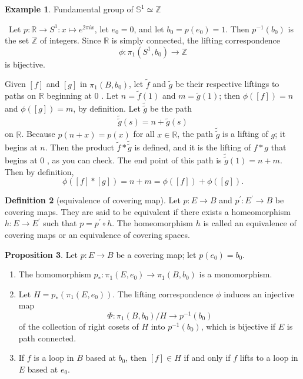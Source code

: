\documentclass[12pt,a4paper]{book}
\newenvironment{prooff}{{\noindent\it\textcolor{cyan!40!black}{Proof}:}\,}{\par}
\newcommand{\bb}[1]{\mathbb{#1}}
\newenvironment{enu}{\begin{enumerate}[(1)]}{\end{enumerate}}
\theoremstyle{definition}
\newtheorem{defn}{Definition}[section]
\newtheorem{prop}[defn]{Proposition}
\newtheorem{exam}[defn]{Example}
\begin{document}
\begin{exam}
    Fundamental group of $\bb{S}^1\simeq \bb{Z}$
    \label{example:fundamental group of S1}
\end{exam}
\begin{prooff}
    Let $p: \mathbb{R} \rightarrow S^1:x\mapsto e^{2\pi ix}$, let $e_0=0$, and let $b_0=p\left(e_0\right)=1$. Then $p^{-1}\left(b_0\right)$ is the set $\mathbb{Z}$ of integers. Since $\mathbb{R}$ is simply connected, the lifting correspondence
    $$
        \phi: \pi_1\left(S^1, b_0\right) \rightarrow \mathbb{Z}
    $$
    is bijective.

    Given $[f]$ and $[g]$ in $\pi_1\left(B, b_0\right)$, let $\tilde{f}$ and $\tilde{g}$ be their respective liftings to paths on $\mathbb{R}$ beginning at 0 . Let $n=\tilde{f}(1)$ and $m=\tilde{g}(1)$; then $\phi([f])=n$ and $\phi([g])=m$, by definition. Let $\tilde{\tilde{g}}$ be the path
    $$
        \tilde{\tilde{g}}(s)=n+\tilde{g}(s)
    $$
    on $\mathbb{R}$. Because $p(n+x)=p(x)$ for all $x \in \mathbb{R}$, the path $\tilde{\tilde{g}}$ is a lifting of $g$; it begins at $n$. Then the product $\tilde{f} * \tilde{\tilde{g}}$ is defined, and it is the lifting of $f * g$ that begins at 0 , as you can check. The end point of this path is $\tilde{\tilde{g}}(1)=n+m$. Then by definition,
    $$
        \phi([f] *[g])=n+m=\phi([f])+\phi([g]) .
    $$
\end{prooff}
\begin{defn}[equivalence of covering map]
    Let $p: E \rightarrow B$ and $p^{\prime}: E^{\prime} \rightarrow B$ be covering maps. They are said to be equivalent if there exists a homeomorphism $h: E \rightarrow E^{\prime}$ such that $p=p^{\prime} \circ h$. The homeomorphism $h$ is called an equivalence of covering maps or an equivalence of covering spaces.
\end{defn}
\begin{prop}
    Let $p: E \rightarrow B$ be a covering map; let $p\left(e_0\right)=b_0$.
    \begin{enu}
        \item  The homomorphism $p_*: \pi_1\left(E, e_0\right) \rightarrow \pi_1\left(B, b_0\right)$ is a monomorphism.
        \item  Let $H=p_*\left(\pi_1\left(E, e_0\right)\right)$. The lifting correspondence $\phi$ induces an injective map
        $$
            \Phi: \pi_1\left(B, b_0\right) / H \rightarrow p^{-1}\left(b_0\right)
        $$
        of the collection of right cosets of $H$ into $p^{-1}\left(b_0\right)$, which is bijective if $E$ is path connected.
        \item  If $f$ is a loop in $B$ based at $b_0$, then $[f] \in H$ if and only if $f$ lifts to a loop in $E$ based at $e_0$.
    \end{enu}
\end{prop}
\end{document}
